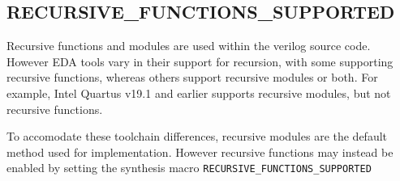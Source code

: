 \subsection{RECURSIVE\_FUNCTIONS\_SUPPORTED}\label{recursive_functions_supported}

Recursive functions and modules are used within the verilog source code. However EDA tools vary in their support for recursion, with some supporting recursive functions, whereas others support recursive modules or both. For example, Intel Quartus v19.1 and earlier supports recursive modules, but not recursive functions. 

To accomodate these toolchain differences, recursive modules are the default method used for implementation. However recursive functions may instead be enabled by setting the synthesis macro \texttt{RECURSIVE\_FUNCTIONS\_SUPPORTED}
